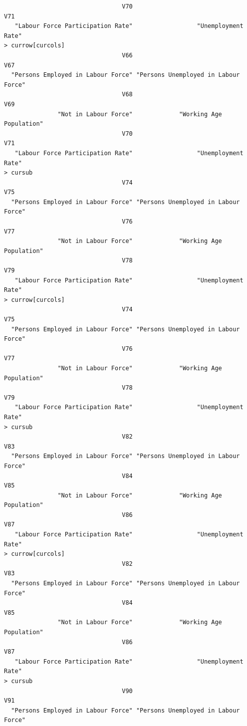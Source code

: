 \documentclass[a4paper]{article}
\begin{document}
\begin{verbatim}
                                 V70                                  V71 
   "Labour Force Participation Rate"                  "Unemployment Rate" 
> currow[curcols] 
                                 V66                                  V67 
  "Persons Employed in Labour Force" "Persons Unemployed in Labour Force" 
                                 V68                                  V69 
               "Not in Labour Force"             "Working Age Population" 
                                 V70                                  V71 
   "Labour Force Participation Rate"                  "Unemployment Rate" 
> cursub 
                                 V74                                  V75 
  "Persons Employed in Labour Force" "Persons Unemployed in Labour Force" 
                                 V76                                  V77 
               "Not in Labour Force"             "Working Age Population" 
                                 V78                                  V79 
   "Labour Force Participation Rate"                  "Unemployment Rate" 
> currow[curcols] 
                                 V74                                  V75 
  "Persons Employed in Labour Force" "Persons Unemployed in Labour Force" 
                                 V76                                  V77 
               "Not in Labour Force"             "Working Age Population" 
                                 V78                                  V79 
   "Labour Force Participation Rate"                  "Unemployment Rate" 
> cursub 
                                 V82                                  V83 
  "Persons Employed in Labour Force" "Persons Unemployed in Labour Force" 
                                 V84                                  V85 
               "Not in Labour Force"             "Working Age Population" 
                                 V86                                  V87 
   "Labour Force Participation Rate"                  "Unemployment Rate" 
> currow[curcols] 
                                 V82                                  V83 
  "Persons Employed in Labour Force" "Persons Unemployed in Labour Force" 
                                 V84                                  V85 
               "Not in Labour Force"             "Working Age Population" 
                                 V86                                  V87 
   "Labour Force Participation Rate"                  "Unemployment Rate" 
> cursub 
                                 V90                                  V91 
  "Persons Employed in Labour Force" "Persons Unemployed in Labour Force" 

\end{verbatim}
\end{document}
